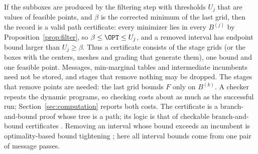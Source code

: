 If the subboxes are produced by the filtering step with thresholds $U_j$ that
are values of feasible points, and $\beta$ is the corrected minimum of the
last grid, then the record is a valid path certificate: every minimizer lies
in every $B^{(j)}$ by Proposition~\ref{prop:filter}, so $\beta\le\OPT\le U_j$,
and a removed interval has endpoint bound larger than $U_j\ge\beta$. Thus a
certificate consists of the stage grids (or the boxes with the centers,
meshes and grading that generate them), one bound and one feasible point.
Messages, min-marginal tables and intermediate incumbents need not be stored,
and stages that remove nothing may be dropped. The stages that remove points
are needed: the last grid bounds $F$ only on $B^{(k)}$. A checker repeats
the dynamic programs, so checking costs about as much as the successful run;
Section~\ref{sec:computation} reports both costs. The certificate is a
branch-and-bound proof whose tree is a path; its logic is that of checkable
branch-and-bound certificates \cite{CheungGleixnerSteffy2017}. Removing an
interval whose bound exceeds an incumbent is optimality-based bound
tightening \cite{RyooSahinidis1996,BelottiEtAl2009,GleixnerEtAl2017}; here all
interval bounds come from one pair of message passes.
